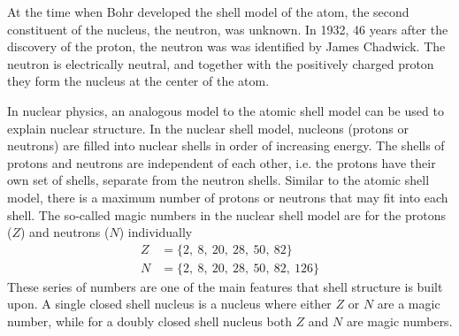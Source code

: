 \documentclass[twoside,english]{uiofysmaster/uiofysmaster}
\begin{document}
At the time when Bohr developed the shell model of the atom, the second constituent of the nucleus, the neutron, was unknown. 
In 1932, 46 years after the discovery of the proton, the neutron was was identified by James Chadwick. 
The neutron is electrically neutral, and together with the positively charged proton they form the nucleus at the center of the atom. 


In nuclear physics, an analogous model to the atomic shell model can be used to explain nuclear structure.
In the nuclear shell model, nucleons (protons or neutrons) are filled into nuclear shells in order of increasing energy. 
The shells of protons and neutrons are independent of each other, i.e. the protons have their own set of shells, separate from the neutron shells.
Similar to the atomic shell model, there is a maximum number of protons or neutrons that may fit into each shell. 
The so-called magic numbers in the nuclear shell model are for the protons ($Z$) and neutrons ($N$) individually
\begin{align*}
	Z &= \{ 2, ~8, ~20, ~28, ~50, ~82 \} \\
	N &= \{ 2, ~8, ~20, ~28, ~50, ~82, ~126 \}
\end{align*}
These series of numbers are one of the main features that shell structure is built upon. 
A single closed shell nucleus is a nucleus where either $Z$ or $N$ are a magic number, while for a doubly closed shell nucleus both $Z$ and $N$ are magic numbers. 
\end{document}
